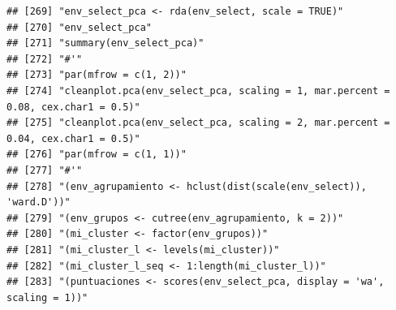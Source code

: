 \documentclass[11pt,]{article}
\begin{document}
\begin{verbatim}
## [269] "env_select_pca <- rda(env_select, scale = TRUE)"                                                                                                                       
## [270] "env_select_pca"                                                                                                                                                        
## [271] "summary(env_select_pca)"                                                                                                                                               
## [272] "#'"                                                                                                                                                                    
## [273] "par(mfrow = c(1, 2))"                                                                                                                                                  
## [274] "cleanplot.pca(env_select_pca, scaling = 1, mar.percent = 0.08, cex.char1 = 0.5)"                                                                                       
## [275] "cleanplot.pca(env_select_pca, scaling = 2, mar.percent = 0.04, cex.char1 = 0.5)"                                                                                       
## [276] "par(mfrow = c(1, 1))"                                                                                                                                                  
## [277] "#'"                                                                                                                                                                    
## [278] "(env_agrupamiento <- hclust(dist(scale(env_select)), 'ward.D'))"                                                                                                       
## [279] "(env_grupos <- cutree(env_agrupamiento, k = 2))"                                                                                                                       
## [280] "(mi_cluster <- factor(env_grupos))"                                                                                                                                    
## [281] "(mi_cluster_l <- levels(mi_cluster))"                                                                                                                                  
## [282] "(mi_cluster_l_seq <- 1:length(mi_cluster_l))"                                                                                                                          
## [283] "(puntuaciones <- scores(env_select_pca, display = 'wa', scaling = 1))"                                                                                                 

\end{verbatim}
\end{document}
